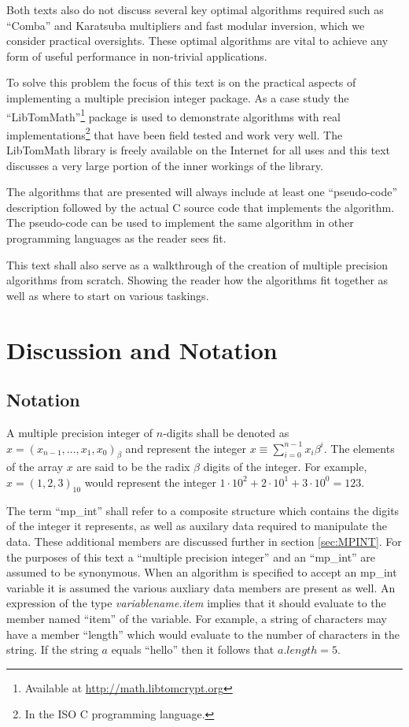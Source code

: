 \documentclass[b5paper]{book}
\begin{document}
Both texts also do not discuss several key optimal algorithms required such as ``Comba'' and Karatsuba multipliers 
and fast modular inversion, which we consider practical oversights.  These optimal algorithms are vital to achieve 
any form of useful performance in non-trivial applications.  

To solve this problem the focus of this text is on the practical aspects of implementing a multiple precision integer
package.  As a case study the ``LibTomMath''\footnote{Available at \url{http://math.libtomcrypt.org}} package is used 
to demonstrate algorithms with real implementations\footnote{In the ISO C programming language.} that have been field 
tested and work very well.  The LibTomMath library is freely available on the Internet for all uses and this text 
discusses a very large portion of the inner workings of the library.

The algorithms that are presented will always include at least one ``pseudo-code'' description followed 
by the actual C source code that implements the algorithm.  The pseudo-code can be used to implement the same 
algorithm in other programming languages as the reader sees fit.  

This text shall also serve as a walkthrough of the creation of multiple precision algorithms from scratch.  Showing
the reader how the algorithms fit together as well as where to start on various taskings.  

\section{Discussion and Notation}
\subsection{Notation}
A multiple precision integer of $n$-digits shall be denoted as $x = (x_{n-1}, \ldots, x_1, x_0)_{ \beta }$ and represent
the integer $x \equiv \sum_{i=0}^{n-1} x_i\beta^i$.  The elements of the array $x$ are said to be the radix $\beta$ digits 
of the integer.  For example, $x = (1,2,3)_{10}$ would represent the integer 
$1\cdot 10^2 + 2\cdot10^1 + 3\cdot10^0 = 123$.  

The term ``mp\_int'' shall refer to a composite structure which contains the digits of the integer it represents, as well 
as auxilary data required to manipulate the data.  These additional members are discussed further in section 
\ref{sec:MPINT}.  For the purposes of this text a ``multiple precision integer'' and an ``mp\_int'' are assumed to be 
synonymous.  When an algorithm is specified to accept an mp\_int variable it is assumed the various auxliary data members 
are present as well.  An expression of the type \textit{variablename.item} implies that it should evaluate to the 
member named ``item'' of the variable.  For example, a string of characters may have a member ``length'' which would 
evaluate to the number of characters in the string.  If the string $a$ equals ``hello'' then it follows that 
$a.length = 5$.  
\end{document}

